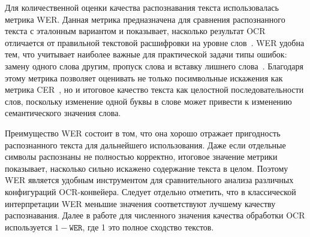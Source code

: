 Для количественной оценки качества распознавания текста использовалась метрика WER. Данная метрика предназначена для сравнения распознанного текста с эталонным вариантом и показывает, насколько результат OCR отличается от правильной текстовой расшифровки на уровне слов~\cite{refOCRMetrics}. WER удобна тем, что учитывает наиболее важные для практической задачи типы ошибок: замену одного слова другим, пропуск слова и вставку лишнего слова~\cite{refOCRMetrics}. Благодаря этому метрика позволяет оценивать не только посимвольные искажения как метрика CER~\cite{refOCRMetrics}, но и итоговое качество текста как целостной последовательности слов, поскольку изменение одной буквы в слове может привести к изменению семантического значения слова.

Преимущество WER состоит в том, что она хорошо отражает пригодность распознанного текста для дальнейшего использования. Даже если отдельные символы распознаны не полностью корректно, итоговое значение метрики показывает, насколько сильно искажено содержание текста в целом. Поэтому WER является удобным инструментом для сравнительного анализа различных конфигураций OCR-конвейера. Следует отдельно отметить, что в классической интерпретации WER меньшие значения соответствуют лучшему качеству распознавания. Далее в работе для численного значения качества обработки OCR используется $1-\mathtt{WER}$, где 1 это полное сходство текстов. 